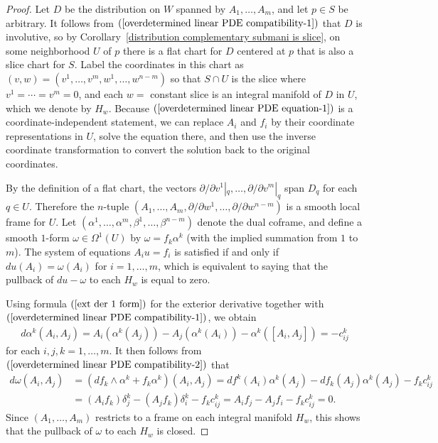 \begin{proof}
Let $D$ be the distribution on $W$ spanned by $A_1,\dots,A_m$, and let $p\in S$ be arbitrary. It follows from $(\ref{overdetermined linear PDE compatibility-1})$ that $D$ is involutive, so by Corollary~\ref{distribution complementary submani is slice}, on some
neighborhood $U$ of $p$ there is a flat chart for $D$ centered at $p$ that is also a slice chart for $S$. Label the coordinates in this chart as $(v,w)=(v^1,\dots,v^m,w^1,\dots,w^{n-m})$ so that $S\cap U$ is the slice where $v^1=\cdots=v^m=0$, and each $w=$ constant slice is an integral manifold of $D$ in $U$, which we denote by $H_w$. Because $(\ref{overdetermined linear PDE equation-1})$ is a coordinate-independent statement, we can replace $A_i$ and $f_i$ by their coordinate representations in $U$, solve the equation there, and then use the inverse coordinate transformation to convert the solution back to the original coordinates.\par
By the definition of a flat chart, the vectors $\partial/\partial v^1|_q,\dots,\partial/\partial v^m|_q$ span $D_q$ for each $q\in U$. Therefore the $n$-tuple $(A_1,\dots,A_m,\partial/\partial w^1,\dots,\partial/\partial w^{n-m})$ is a smooth local frame for $U$. Let $(\alpha^1,\dots,\alpha^m,\beta^1,\dots,\beta^{n-m})$ denote the dual coframe, and define a smooth $1$-form $\omega\in\Omega^1(U)$ by $\omega=f_k\alpha^k$ (with the implied summation from $1$ to $m$). The system of equations $A_iu=f_i$ is satisfied if and only if $du(A_i)=\omega(A_i)$ for $i=1,\dots,m$, which is equivalent to saying that the pullback of $du-\omega$ to each $H_w$ is equal to zero.\par
Using formula $(\ref{ext der 1 form})$ for the exterior derivative together with $(\ref{overdetermined linear PDE compatibility-1})$, we obtain
\begin{align*}
d\alpha^k(A_i,A_j)=A_i(\alpha^k(A_j))-A_j(\alpha^k(A_i))-\alpha^k([A_i,A_j])=-c_{ij}^k
\end{align*}
for each $i,j,k=1,\dots,m$. It then follows from $(\ref{overdetermined linear PDE compatibility-2})$ that
\begin{align*}
d\omega(A_i,A_j)&=(df_k\wedge\alpha^k+f_k\alpha^k)(A_i,A_j)=df^k(A_i)\alpha^k(A_j)-df_k(A_j)\alpha^k(A_j)-f_kc_{ij}^k\\
&=(A_if_k)\delta^k_j-(A_jf_k)\delta^k_i-f_kc_{ij}^k=A_if_j-A_jf_i-f_kc_{ij}^k=0.
\end{align*}
Since $(A_1,\dots,A_m)$ restricts to a frame on each integral manifold $H_w$, this shows that the pullback of $\omega$ to each $H_w$ is closed.\par

\end{proof}
